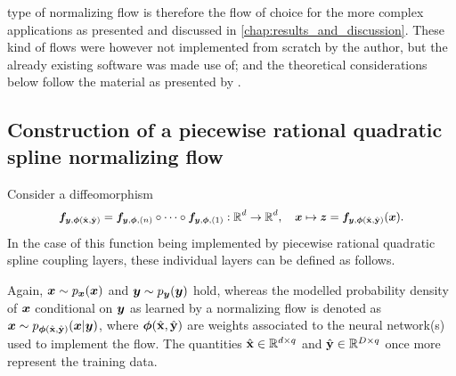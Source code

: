 \documentclass[a4paper,11pt]{report}
\def\fc#1{{\color{black}{#1}}} %
\begin{document}
\fc{The piecewise rational quadratic spline normalizing flow} type of normalizing flow is therefore the flow of choice for the more complex applications as presented and discussed in \cref{chap:results_and_discussion}. These kind of flows were however not implemented from scratch by the author, but the already existing software \cite{nflows} was made use of; and the theoretical considerations below follow the material as presented by \cite{Durkan.10.06.2019}.

\subsection{Construction of a piecewise rational quadratic spline normalizing flow}\label{sec:piecewisequadraticspline}
Consider a diffeomorphism \begin{align}\small\begin{aligned}
\bm{f}_{\bm{y},\bm{\phi}(\hat{\boldsymbol{\mathbf{x}}},\hat{\boldsymbol{\mathbf{y}}})} = \bm{f}_{\bm{y},\bm{\phi},(n)}\circ \dots \circ \bm{f}_{\bm{y},\bm{\phi},(1)}: \mathbb{R}^d \rightarrow \mathbb{R}^d, \quad \bm{x} \mapsto \bm{z} = \bm{f}_{\bm{y},\bm{\phi}(\hat{\boldsymbol{\mathbf{x}}},\hat{\boldsymbol{\mathbf{y}}})}(\bm{x}).
\end{aligned}\end{align} In the case of this function being implemented by piecewise rational quadratic spline coupling layers, these individual layers can be defined as follows.

Again, $\bm{x} \sim p_{\bm{x}}(\bm{x})$ and $\bm{y} \sim p_{\bm{y}}(\bm{y})$ hold, whereas the modelled probability density of $\bm{x}$ conditional on $\bm{y}$ as learned by a normalizing flow is denoted as $\bm{x} \sim p_{\bm{\phi}(\hat{\boldsymbol{\mathbf{x}}},\hat{\boldsymbol{\mathbf{y}}})}(\bm{x}|\bm{y})$, where $\bm{\phi}(\hat{\boldsymbol{\mathbf{x}}},\hat{\boldsymbol{\mathbf{y}}})$ are weights associated to the neural network(s) used to implement the flow. The quantities $\hat{\boldsymbol{\mathbf{x}}} \in \mathbb{R}^{d\times q}$ and $\hat{\boldsymbol{\mathbf{y}}} \in \mathbb{R}^{D \times q}$ once more represent the training data.
\end{document}
